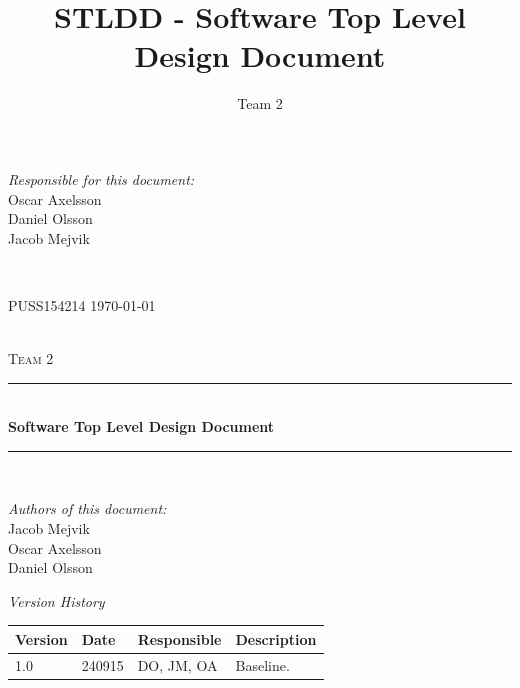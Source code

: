 \documentclass[a4paper]{article}
\title{STLDD - Software Top Level Design Document}
\author{Team 2}
\begin{document}
	\begin{titlepage}
		\newcommand{\HRule}{\rule{\linewidth}{0.5mm}}
		
		\begin{minipage}{0.5\textwidth}
			\begin{flushleft} %
				\textit{Responsible for this document:}\\
				Oscar Axelsson \\
				Daniel Olsson \\
				Jacob Mejvik
			\end{flushleft}
		\end{minipage}
		~
		\begin{minipage}{0.4\textwidth}
			\begin{flushright}
				PUSS154214
				\today
			\end{flushright}
		\end{minipage}\\[3cm]
		
		\centering
		\textsc{\LARGE Team 2}\\[0.5cm]
		
		\HRule \\[0.4cm]
		{ \huge \bfseries Software Top Level Design Document}\\[0.4cm] %
		\HRule \\[1.5cm]
		
		\vfill
		\begin{flushleft}
			\textit{Authors of this document:}\\
			Jacob Mejvik \\
			Oscar Axelsson \\
			Daniel Olsson
		\end{flushleft}
		
	\end{titlepage}
	\setcounter{tocdepth}{2}
	
	\begin{center}
		\textit{\large Version History}
		
		\begin{tabular}{ | l | l | l | p{5cm} |}
			\hline
			\textbf{Version} 	& \textbf{Date} 	& \textbf{Responsible} 	& \textbf{Description} 		\\ \hline
			1.0				 	& 240915 			& DO, JM, OA			&  Baseline. 				\\ \hline
		\end{tabular}
	\end{center}
	
\end{document}
